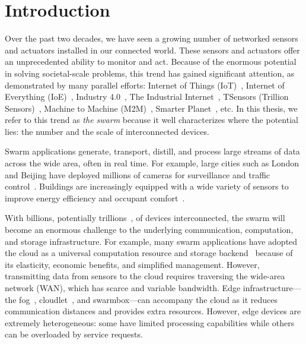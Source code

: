 \documentclass[thesis.tex]{subfiles}
\begin{document}
\chapter{Introduction}

Over the past two decades, we have seen a growing number of networked sensors
and actuators installed in our connected world. These sensors and actuators
offer an unprecedented ability to monitor and act. Because of the enormous
potential in solving societal-scale problems, this trend has gained significant
attention, as demonstrated by many parallel efforts: Internet of Things
(IoT)~\cite{atzori2010internet}, Internet of Everything
(IoE)~\cite{bradley2013internet}, Industry 4.0~\cite{lasi2014industry}, The
Industrial Internet~\cite{eigner2018industrial}, TSensors (Trillion
Sensors)~\cite{bogue2014towards}, Machine to Machine
(M2M)~\cite{anton2014machine}, Smarter Planet~\cite{palmisano2008smarter},
etc. In this thesis, we refer to this trend as \textit{the swarm} because it
well characterizes where the potential lies: the number and the scale of
interconnected devices.

Swarm applications generate, transport, distill, and process large streams of
data across the wide area, often in real time. For example, large cities such as
London and Beijing have deployed millions of cameras for surveillance and
traffic control~\cite{skynet, london.surveillance}. Buildings are increasingly
equipped with a wide variety of sensors to improve energy efficiency and
occupant comfort~\cite{dawson2010smap, krioukov2012building}.

With billions, potentially trillions~\cite{middleton2013forecast}, of devices
interconnected, the swarm will become an enormous challenge to the underlying
communication, computation, and storage infrastructure. For example, many swarm
applications have adopted the cloud as a universal computation resource and
storage backend~\cite{carriots, sami, gupta2014bolt, zachariah1001internet}
because of its elasticity, economic benefits, and simplified
management. However, transmitting data from sensors to the cloud requires
traversing the wide-area network (WAN), which has scarce and variable
bandwidth. Edge infrastructure---the fog~\cite{bonomi2012fog, bar2013fog},
cloudlet~\cite{ha2014towards, satyanarayanan2009case, chen2018application}, and
swarmbox---can accompany the cloud as it reduces communication distances and
provides extra resources. However, edge devices are extremely heterogeneous:
some have limited processing capabilities while others can be overloaded by
service requests.
\end{document}
